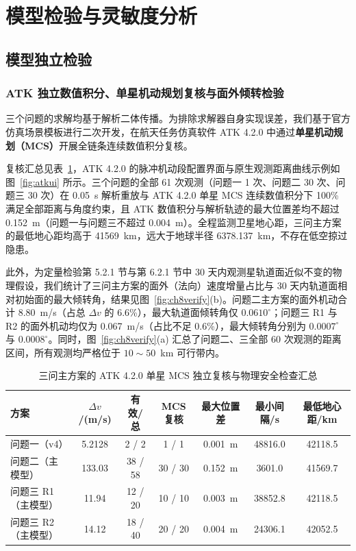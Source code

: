 \section{模型检验与灵敏度分析}

\subsection{模型独立检验}

\subsubsection{ATK 独立数值积分、单星机动规划复核与面外倾转检验}

三个问题的求解均基于解析二体传播。为排除求解器自身实现误差，我们基于官方仿真场景模板进行二次开发，在航天任务仿真软件 ATK 4.2.0\cite{atk4} 中通过\textbf{单星机动规划（MCS）}开展全链条连续数值积分复核。

复核汇总见表~\ref{tab:atkall}，ATK 4.2.0 的脉冲机动段配置界面与原生观测距离曲线示例如图~\ref{fig:atkui} 所示。三个问题的全部 61 次观测（问题一 1 次、问题二 30 次、问题三 30 次）在 0.05~s 解析重放与 ATK 4.2.0 单星 MCS 连续数值积分下 100\% 满足全部距离与角度约束，且 ATK 数值积分与解析轨迹的最大位置差均不超过 0.152~m（问题一与问题三不超过 0.004~m）。全程监测卫星地心距，三问主方案的最低地心距均高于 41569~km，远大于地球半径 6378.137~km，不存在低空掠过隐患。

此外，为定量检验第 5.2.1 节与第 6.2.1 节中 30 天内观测星轨道面近似不变的物理假设，我们统计了三问主方案的面外（法向）速度增量占比与 30 天内轨道面相对初始面的最大倾转角，结果见图~\ref{fig:ch8verify}(b)。问题二主方案的面外机动合计 8.80~m/s（占总 $\Delta v$ 的 6.6\%），最大轨道面倾转角仅 $0.0610^\circ$；问题三 R1 与 R2 的面外机动均仅为 0.067~m/s（占比不足 0.6\%），最大倾转角分别为 $0.0007^\circ$ 与 $0.0008^\circ$。同时，图~\ref{fig:ch8verify}(a) 汇总了问题二、三全部 60 次观测的距离区间，所有观测均严格位于 $10\sim 50$~km 可行带内。

\begin{table}[!htb]
  \centering
  \caption{三问主方案的 ATK 4.2.0 单星 MCS 独立复核与物理安全检查汇总}
  \label{tab:atkall}
  \setlength{\tabcolsep}{2.4pt}
  \begin{tabular}{lcccccc}
    \toprule
    方案 & $\Delta v$/(m/s) & 有效/总 & MCS 复核 & 最大位置差 & 最小间隔/s & 最低地心距/km \\
    \midrule
    问题一（v4） & 5.2128 & 2 / 2 & 1 / 1 & 0.001~m & 48816.0 & 42118.5 \\
    问题二（主模型） & 133.03 & 38 / 58 & 30 / 30 & 0.152~m & 3601.0 & 41569.7 \\
    问题三 R1（主模型） & 11.94 & 12 / 20 & 10 / 10 & 0.003~m & 38852.8 & 42118.5 \\
    问题三 R2（主模型） & 14.12 & 18 / 40 & 20 / 20 & 0.004~m & 24306.1 & 42052.5 \\
    \bottomrule
  \end{tabular}
\end{table}

